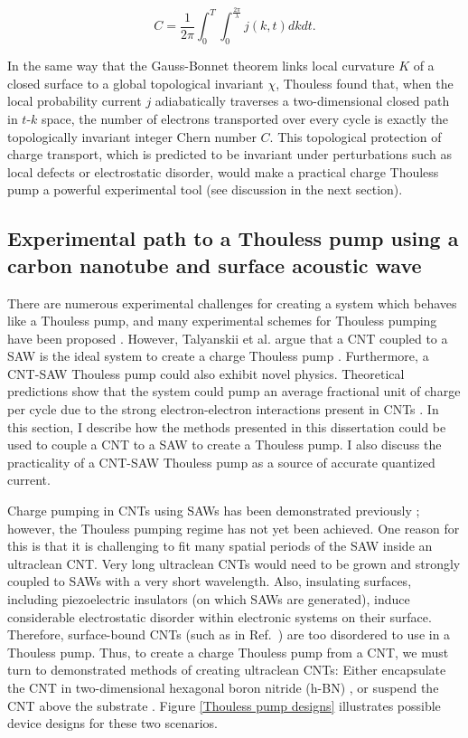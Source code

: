 \documentclass{beavtex_dub_edit}
\begin{document}
\begin{equation}
    C = \frac{1}{2\pi} \int_{0}^{T} \int_{0}^{\frac{2\pi}{\lambda}} j(k,t) dkdt. \label{Thouless Chern equation}
\end{equation}

In the same way that the Gauss-Bonnet theorem links local curvature $K$ of a closed surface to a global topological invariant $\chi$, Thouless found that, when the local probability current $j$ adiabatically traverses a two-dimensional closed path in $t\textrm{-}k$ space, the number of electrons transported over every cycle is exactly the topologically invariant integer Chern number $C$. This topological protection of charge transport, which is predicted to be invariant under perturbations such as local defects or electrostatic disorder, would make a practical charge Thouless pump a powerful experimental tool (see discussion in the next section).

\subsection{Experimental path to a Thouless pump using a carbon nanotube and surface acoustic wave} 

There are numerous experimental challenges for creating a system which behaves like a Thouless pump, and many experimental schemes for Thouless pumping have been proposed \cite{citro_thouless_2023}. However, Talyanskii et al. argue that a CNT coupled to a SAW is the ideal system to create a charge Thouless pump \cite{talyanskii_quantized_2001}. Furthermore, a CNT-SAW Thouless pump could also exhibit novel physics. Theoretical predictions show that the system could pump an average fractional unit of charge per cycle due to the strong electron-electron interactions present in CNTs \cite{novikov_devils_2005}. In this section, I describe how the methods presented in this dissertation could be used to couple a CNT to a SAW to create a Thouless pump. I also discuss the practicality of a CNT-SAW Thouless pump as a source of accurate quantized current.

Charge pumping in CNTs using SAWs has been demonstrated previously \cite{buitelaar_adiabatic_2008}; however, the Thouless pumping regime has not yet been achieved. One reason for this is that it is challenging to fit many spatial periods of the SAW inside an ultraclean CNT. Very long ultraclean CNTs would need to be grown and strongly coupled to SAWs with a very short wavelength. Also, insulating surfaces, including piezoelectric insulators (on which SAWs are generated), induce considerable electrostatic disorder within electronic systems on their surface. Therefore, surface-bound CNTs (such as in Ref.\ \cite{buitelaar_adiabatic_2008}) are too disordered to use in a Thouless pump. Thus, to create a charge Thouless pump from a CNT, we must turn to demonstrated methods of creating ultraclean CNTs: Either encapsulate the CNT in two-dimensional hexagonal boron nitride (h-BN) \cite{huang_superior_2015}, or suspend the CNT above the substrate \cite{senger_universal_2018}. Figure \ref{Thouless pump designs} illustrates possible device designs for these two scenarios.
\end{document}

